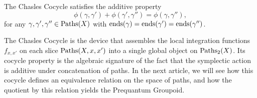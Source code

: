 \documentclass[10pt,reqno,letterpaper,twoside]{amsbook}
\begin{document}
\begin{article}
    \begin{proposition}
      The Chasles Cocycle satisfies the additive property
      \[
        \phi(\gamma,\gamma') + \phi(\gamma',\gamma'') = \phi(\gamma,\gamma''),
        \]%
      for any $\gamma,\gamma',\gamma'' \in \operatorname{Paths}(X)$ with
      $\operatorname{ends}(\gamma) = \operatorname{ends}(\gamma') = \operatorname{ends}(\gamma'')$.
    \end{proposition}
    
    The Chasles Cocycle is the device that assembles the local integration
    functions $f_{x,x'}$ on each slice $\operatorname{Paths}(X,x,x')$
    into a single global object on $\operatorname{Paths}_2(X)$.
    Its cocycle property is the algebraic signature of the fact
    that the symplectic action is additive under concatenation of paths.
    In the next article,
    we will see how this cocycle defines an equivalence relation
    on the space of paths,
    and how the quotient by this relation yields the
    Prequantum Groupoid.
  \end{article}
  
\end{document}
